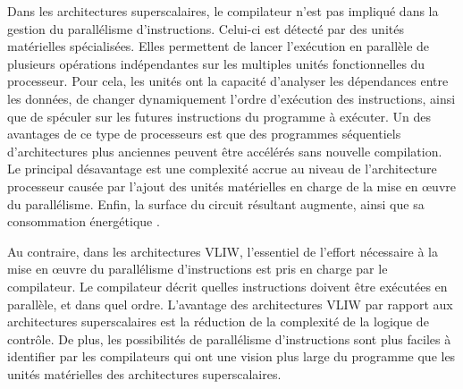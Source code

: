 Dans les architectures superscalaires, le compilateur n'est pas impliqué dans la gestion du parallélisme d'instructions. Celui-ci est détecté par des unités matérielles spécialisées. 
Elles permettent de lancer l'exécution en parallèle de plusieurs opérations indépendantes sur les multiples unités fonctionnelles du processeur.
Pour cela, les unités ont la capacité d'analyser les dépendances entre les données, de changer dynamiquement l'ordre d'exécution des instructions, ainsi que de spéculer sur les futures instructions du programme à exécuter.
Un des avantages de ce type de processeurs est que des programmes séquentiels d'architectures plus anciennes peuvent être accélérés sans nouvelle compilation. Le principal désavantage est une  complexité accrue au niveau de l'architecture processeur causée par l'ajout des unités matérielles en charge de la mise en œuvre du parallélisme. Enfin, la surface du circuit résultant augmente, ainsi que sa consommation énergétique \cite{rau1993instruction}.

Au contraire, dans les architectures VLIW, l'essentiel de l'effort nécessaire à la mise en œuvre du parallélisme d'instructions est pris en charge par le compilateur. Le compilateur décrit quelles instructions doivent être exécutées en parallèle, et dans quel ordre. L'avantage des architectures VLIW par rapport aux architectures superscalaires est la réduction de la complexité de la logique de contrôle. De plus, les possibilités de parallélisme d'instructions sont plus faciles à identifier par les compilateurs qui ont une vision plus large du programme que les unités matérielles des architectures superscalaires.


